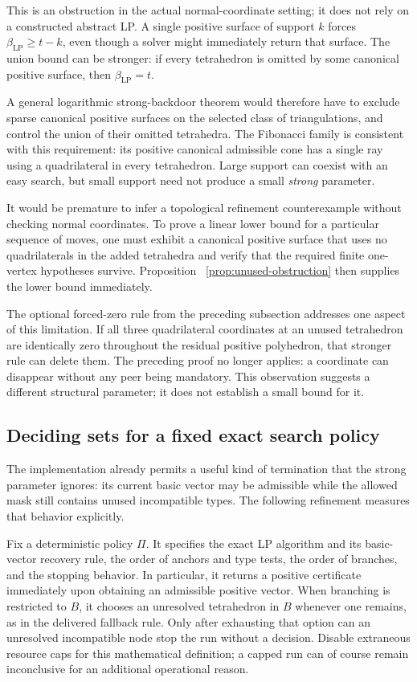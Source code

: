 This is an obstruction in the actual normal-coordinate setting; it
does not rely on a constructed abstract LP. A single positive surface
of support $k$ forces $\beta_{\mathrm{LP}}\ge t-k$, even though a solver
might immediately return that surface. The union bound can be stronger:
if every tetrahedron is omitted by some canonical positive surface,
then $\beta_{\mathrm{LP}}=t$.

A general logarithmic strong-backdoor theorem would therefore have to
exclude sparse canonical positive surfaces on the selected class of
triangulations, and control the union of their omitted tetrahedra. The
Fibonacci family is consistent with this requirement: its positive
canonical admissible cone has a single ray using a quadrilateral in
every tetrahedron. Large support can coexist with an easy search, but
small support need not produce a small \emph{strong} parameter.

It would be premature to infer a topological refinement counterexample
without checking normal coordinates. To prove a linear lower bound for
a particular sequence of moves, one must exhibit a canonical positive
surface that uses no quadrilaterals in the added tetrahedra and verify
that the required finite one-vertex hypotheses survive. Proposition~
\ref{prop:unused-obstruction} then supplies the lower bound immediately.

The optional forced-zero rule from the preceding subsection addresses
one aspect of this limitation. If all three quadrilateral coordinates
at an unused tetrahedron are identically zero throughout the residual
positive polyhedron, that stronger rule can delete them. The preceding
proof no longer applies: a coordinate can disappear without any peer
being mandatory. This observation suggests a different structural
parameter; it does not establish a small bound for it.

\subsection{Deciding sets for a fixed exact search policy}
\label{sec:deciding-sets}

The implementation already permits a useful kind of termination that
the strong parameter ignores: its current basic vector may be
admissible while the allowed mask still contains unused incompatible
types. The following refinement measures that behavior explicitly.

Fix a deterministic policy $\Pi$. It specifies the exact LP algorithm
and its basic-vector recovery rule, the order of anchors and type tests,
the order of branches, and the stopping behavior. In particular, it
returns a positive certificate immediately upon obtaining an admissible
positive vector. When branching is restricted to $B$, it chooses an
unresolved tetrahedron in $B$ whenever one remains, as in the delivered
fallback rule. Only after exhausting that option can an unresolved
incompatible node stop the run without a decision. Disable extraneous
resource caps for this mathematical definition; a capped run can of
course remain inconclusive for an additional operational reason.

